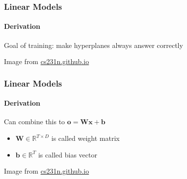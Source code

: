 \documentclass[xetex,professionalfont]{beamer}
\renewcommand\emph[1]{\textcolor{tuwcvl_cvl_blue}{#1}}
\newcommand{\RR}{\mathbb{R}}
\renewcommand{\vec}[1]{\ensuremath{\mathbf{#1}}}
\newcommand{\vb}{\vec{b}}
\newcommand{\vx}{\vec{x}}
\newcommand{\vo}{\vec{o}}
\newcommand{\vW}{\vec{W}}
\begin{document}
\begin{frame}
  \frametitle{Linear Models}
  \framesubtitle{Derivation}

Goal of training: make hyperplanes always answer correctly

\medskip

\begin{center}
    {\centering Image from \href{http://cs231n.github.io/}{cs231n.github.io}}
\end{center}

\end{frame}


\begin{frame}
  \frametitle{Linear Models}
  \framesubtitle{Derivation}

Can combine this to $\vo=\vec{W}\vx+\vb$
\begin{itemize}
    \item $\vW\in\RR^{T\times D}$ is called \emph{weight matrix}
    \item $\vb\in\RR^T$ is called \emph{bias vector}
\end{itemize}

\medskip

\begin{center}
    {\centering Image from \href{http://cs231n.github.io/}{cs231n.github.io}}
\end{center}

\end{frame}
\end{document}
